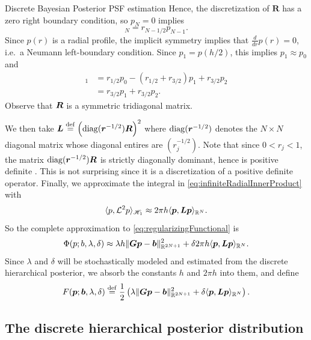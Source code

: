 \begin{chapter}{Discrete Bayesian Posterior PSF estimation}
Hence, the discretization of $\bm R$ has a zero right boundary condition, so $p_{N}= 0$ implies
\begin{equation}
  [\vect R\vect p]_N = r_{N-1/2}p_{N-1}.
\end{equation}
Since $p(r)$ is a radial profile, the implicit symmetry implies that $\frac d{dr}p(r) = 0$, i.e.~a Neumann left-boundary condition. 
Since $p_1 = p( h/2 )$, this implies $p_1 \approx p_{0}$ and
\begin{align}
  [\vect R\vect p]_1 &= r_{1/2}p_0 - (r_{1/2}+r_{3/2})p_1 + r_{3/2}p_{2} \nonumber\\
  &= r_{3/2}p_1 + r_{3/2}p_{2}.
\end{align}
Observe that $\mbox{\boldmath$R$}$ is a symmetric tridiagonal matrix.

We then take $\mbox{\boldmath$L$} \stackrel{\rm def}{=} \Big(\mathrm{diag}(\mbox{\boldmath$r$}^{-1/2}) \mbox{\boldmath$R$}\Big)^2$ where $\mathrm{diag}(\mbox{\boldmath$r$}^{-1/2})$ denotes the $N\times N$ diagonal matrix whose diagonal entires are $(r_j^{-1/2})$.
Note that since $0<r_j<1$, the matrix $\mathrm{diag}(\mbox{\boldmath$r$}^{-1/2}) \mbox{\boldmath$R$}$ is strictly diagonally dominant, hence is positive definite \citep[Theorem 3.4.3]{golub2012matrix}.
This is not surprising since it is a discretization of a positive definite operator.
Finally, we approximate the integral in \eqref{eq:infiniteRadialInnerProduct} with 
\begin{equation}\label{eq:psfDiscInvProblem}
  \langle p, \mathcal L^2 p\rangle_{\mathscr H_1} \approx 2\pi h \langle \mbox{\boldmath$p$}, \mbox{\boldmath$L$} \mbox{\boldmath$p$}\rangle_{\mathbb R^N}.
\end{equation}
So the complete approximation to \eqref{eq:regularizingFunctional} is
\begin{equation} \label{eq:discreteRegularizingFunctional}
  \Phi(p; b,\lambda,\delta) \approx \lambda h \|\mbox{\boldmath$G$}\mbox{\boldmath$p$} - \mbox{\boldmath$b$}\|_{\mathbb R^{2N+1}}^2 + \delta 2\pi h\langle \mbox{\boldmath$p$}, \mbox{\boldmath$L$} \mbox{\boldmath$p$}\rangle_{\mathbb R^N}.
\end{equation}
Since $\lambda$ and $\delta$ will be stochastically modeled and estimated from the discrete hierarchical posterior, we absorb the constants $h$ and $2\pi h$ into them, and define
\begin{equation} \label{discreteRegularizingFunctional}
  F(\mbox{\boldmath$p$}; \mbox{\boldmath$b$},\lambda,\delta) \stackrel{\rm def}{=} \frac 12\left(\lambda \|\mbox{\boldmath$G$}\mbox{\boldmath$p$} - \mbox{\boldmath$b$}\|_{\mathbb R^{2N+1}}^2 + \delta \langle \mbox{\boldmath$p$}, \mbox{\boldmath$L$} \mbox{\boldmath$p$}\rangle_{\mathbb R^N}\right).
\end{equation}
\subsection{The discrete hierarchical posterior distribution} \label{subsec:discretePosteriorDerivation}


\end{chapter}
